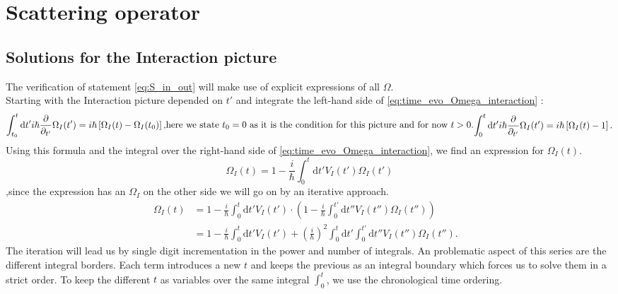 \documentclass[12pt, titlepage]{article}
\begin{document}
\section{Scattering operator}
\subsection{Solutions for the Interaction picture}
The verification of statement \eqref{eq:S_in_out} will make use of explicit expressions of all $ \Omega $.\\
Starting with the Interaction picture depended on $ t' $  and integrate the left-hand side of \eqref{eq:time_evo_Omega_interaction} :
\begin{subequations}
\begin{align}
\int_{t_{0}}^{t}\mathrm{d}t'
 i\hbar 
 \frac{\partial}{\partial_{t'}} 
 \Omega_{I} (t')
 =
 i\hbar
 \left[ 
\Omega_{I}(t) -\Omega_{I}(t_{0})
 \right] 
 ,
\end{align}
\text{here we state $ t_{0} = 0 $ as it is the condition for this picture and for now $ t>0 $.}
\begin{align}
\int_{0}^{t}\mathrm{d}t'
 i\hbar 
 \frac{\partial}{\partial_{t'}} 
 \Omega_{I} (t')
 =
 i\hbar
 \left[ 
\Omega_{I}(t) -1
 \right] 
 .
\end{align}
\end{subequations}
Using this formula and the integral over the right-hand side of \eqref{eq:time_evo_Omega_interaction}, we find an expression for $ \Omega_{I}(t) $.
\begin{equation}
\Omega_{I}(t)=
1
-
\frac{i}{\hbar} 
\int_{0}^{t}\mathrm{d}t'V_{I}(t')\Omega_{I}(t')	
\end{equation}
,since the expression has an $ \Omega_{I} $ on the other side we will go on by an iterative approach.
\begin{subequations}
\begin{align}
\Omega_{I}(t)
&=
1
-
\frac{i}{\hbar} 
\int_{0}^{t}\mathrm{d}t'V_{I}(t')
\cdot
\left( 
1
-
\frac{i}{\hbar} 
\int_{0}^{t'}\mathrm{d}t''V_{I}(t'')\Omega_{I}(t'')
\right) 
&\\
&=
1
-
\frac{i}{\hbar} 
\int_{0}^{t}\mathrm{d}t'V_{I}(t')
+(\frac{i}{\hbar})^{2} 
\int_{0}^{t}\mathrm{d}t'
\int_{0}^{t'}\mathrm{d}t''
V_{I}(t'')\Omega_{I}(t'').
\end{align}
\end{subequations}
The iteration will lead us by single digit incrementation in the power and number of integrals. An problematic aspect of this series are the different integral borders. Each term introduces a new $ t $ and keeps the previous as an integral boundary which forces us to solve them in a strict order. To keep the different $ t $ as variables over the same integral $ \int_{0}^{t} $, we use the chronological time ordering.
\end{document}
